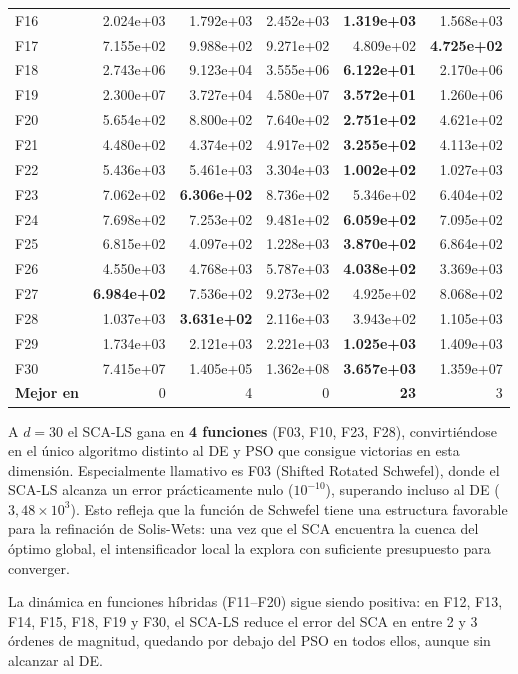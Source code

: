 \documentclass[12pt,a4paper]{article}
\begin{document}
\begin{longtable}{lrrrrr}
F16  & 2.024e+03 & 1.792e+03 & 2.452e+03 & \textbf{1.319e+03} & 1.568e+03 \\
F17  & 7.155e+02 & 9.988e+02 & 9.271e+02 & 4.809e+02 & \textbf{4.725e+02} \\
F18  & 2.743e+06 & 9.123e+04 & 3.555e+06 & \textbf{6.122e+01} & 2.170e+06 \\
F19  & 2.300e+07 & 3.727e+04 & 4.580e+07 & \textbf{3.572e+01} & 1.260e+06 \\
F20  & 5.654e+02 & 8.800e+02 & 7.640e+02 & \textbf{2.751e+02} & 4.621e+02 \\
F21  & 4.480e+02 & 4.374e+02 & 4.917e+02 & \textbf{3.255e+02} & 4.113e+02 \\
F22  & 5.436e+03 & 5.461e+03 & 3.304e+03 & \textbf{1.002e+02} & 1.027e+03 \\
F23  & 7.062e+02 & \textbf{6.306e+02} & 8.736e+02 & 5.346e+02 & 6.404e+02 \\
F24  & 7.698e+02 & 7.253e+02 & 9.481e+02 & \textbf{6.059e+02} & 7.095e+02 \\
F25  & 6.815e+02 & 4.097e+02 & 1.228e+03 & \textbf{3.870e+02} & 6.864e+02 \\
F26  & 4.550e+03 & 4.768e+03 & 5.787e+03 & \textbf{4.038e+02} & 3.369e+03 \\
F27  & \textbf{6.984e+02} & 7.536e+02 & 9.273e+02 & 4.925e+02 & 8.068e+02 \\
F28  & 1.037e+03 & \textbf{3.631e+02} & 2.116e+03 & 3.943e+02 & 1.105e+03 \\
F29  & 1.734e+03 & 2.121e+03 & 2.221e+03 & \textbf{1.025e+03} & 1.409e+03 \\
F30  & 7.415e+07 & 1.405e+05 & 1.362e+08 & \textbf{3.657e+03} & 1.359e+07 \\
\midrule
\textbf{Mejor en} & 0 & 4 & 0 & \textbf{23} & 3 \\
\end{longtable}

A $d=30$ el SCA-LS gana en \textbf{4 funciones} (F03, F10, F23, F28), convirtiéndose en el único algoritmo distinto al DE y PSO que consigue victorias en esta dimensión. Especialmente llamativo es F03 (Shifted Rotated Schwefel), donde el SCA-LS alcanza un error prácticamente nulo ($10^{-10}$), superando incluso al DE ($3{,}48 \times 10^3$). Esto refleja que la función de Schwefel tiene una estructura favorable para la refinación de Solis-Wets: una vez que el SCA encuentra la cuenca del óptimo global, el intensificador local la explora con suficiente presupuesto para converger.

La dinámica en funciones híbridas (F11--F20) sigue siendo positiva: en F12, F13, F14, F15, F18, F19 y F30, el SCA-LS reduce el error del SCA en entre 2 y 3 órdenes de magnitud, quedando por debajo del PSO en todos ellos, aunque sin alcanzar al DE.
\end{document}
